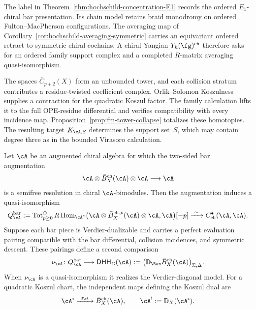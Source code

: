 \begin{remark}
\label{rem:E1-scope-hochschild-concentration}
The label in Theorem~\ref{thm:hochschild-concentration-E1} records the
ordered \(E_1\)-chiral bar presentation.  Its chain model retains braid
monodromy on ordered Fulton--MacPherson configurations.  The averaging
map of Corollary~\ref{cor:hochschild-averaging-symmetric} carries an
equivariant ordered retract to symmetric chiral cochains.  A chiral
Yangian \(Y_\hbar(\fg)^{\mathrm{ch}}\) therefore asks for an ordered
family support complex and a completed \(R\)-matrix averaging
quasi-isomorphism.
\end{remark}

\begin{remark}
\label{rem:fm-collapse-nontrivial}
The spaces \(\overline C_{p+2}(X)\) form an unbounded tower, and each
collision stratum contributes a residue-twisted coefficient complex.
Orlik--Solomon Koszulness supplies a contraction for the quadratic
Koszul factor.  The family calculation lifts it to the full
OPE-residue differential and verifies compatibility with every
incidence map.  Proposition~\ref{prop:fm-tower-collapse} totalizes
these homotopies.  The resulting target \(K_{\cA,S}\) determines the
support set~\(S\), which may contain degree three as in the bounded
Virasoro calculation.
\end{remark}

\begin{lemma}
\label{lem:chirhoch-descent}
Let \(\cA\) be an augmented chiral algebra for which the two-sided
bar augmentation
\[
 \cA\otimes\bar B_X^{\mathrm{ch}}(\cA)\otimes\cA
 \longrightarrow\cA
\]
is a semifree resolution in chiral \(\cA\)-bimodules.  Then the
augmentation induces a quasi-isomorphism
\begin{equation}
\label{eq:chirhoch-descent}
 Q_\cA^{\mathrm{bar}}
 :=\operatorname{Tot}^{\oplus}_{p\geq0}
 R\operatorname{Hom}_{\cA^e}
 \bigl(\cA\otimes\bar B_X^{\mathrm{ch},p}(\cA)
 \otimes\cA,\cA\bigr)[-p]
 \xrightarrow{\ \sim\ }
 C^\bullet_{\mathrm{ch}}(\cA,\cA).
\end{equation}
Suppose each bar piece is Verdier-dualizable and carries a perfect
evaluation pairing compatible with the bar differential, collision
incidences, and symmetric descent.  These pairings define a second
comparison
\[
 \nu_\cA\colon Q_\cA^{\mathrm{bar}}
 \longrightarrow
 \mathsf{DHH}_\Sigma(\cA)
 :=\bigl(\mathbb D_{\Ran}
 \bar B_X^{\mathrm{ch}}(\cA)\bigr)_{\Sigma,\Delta}.
\]
When \(\nu_\cA\) is a quasi-isomorphism it realizes the
Verdier-diagonal model.  For a quadratic Koszul chart, the independent
maps defining the Koszul dual are
\[
 \cA^i\xrightarrow{\ q_\cA\ }
 \bar B_X^{\mathrm{ch}}(\cA),
 \qquad
 \cA^!:=\mathbb D_X(\cA^i).
\]
\end{lemma}

